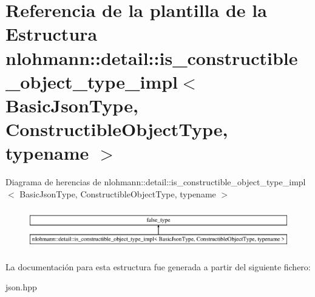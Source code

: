 \hypertarget{structnlohmann_1_1detail_1_1is__constructible__object__type__impl}{}\section{Referencia de la plantilla de la Estructura nlohmann\+:\+:detail\+:\+:is\+\_\+constructible\+\_\+object\+\_\+type\+\_\+impl$<$ Basic\+Json\+Type, Constructible\+Object\+Type, typename $>$}
\label{structnlohmann_1_1detail_1_1is__constructible__object__type__impl}
Diagrama de herencias de nlohmann\+:\+:detail\+:\+:is\+\_\+constructible\+\_\+object\+\_\+type\+\_\+impl$<$ Basic\+Json\+Type, Constructible\+Object\+Type, typename $>$\begin{figure}[H]
\begin{center}
\leavevmode
\includegraphics[height=1.789137cm]{structnlohmann_1_1detail_1_1is__constructible__object__type__impl}
\end{center}
\end{figure}


La documentación para esta estructura fue generada a partir del siguiente fichero\+:\begin{DoxyCompactItemize}
\item 
json.\+hpp\end{DoxyCompactItemize}
